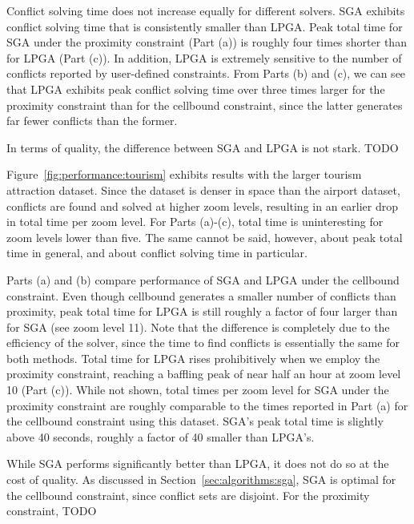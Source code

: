 Conflict solving time does not increase equally for different solvers. SGA exhibits conflict solving time that is consistently smaller than LPGA. Peak total time for SGA under the proximity constraint (Part (a)) is roughly four times shorter than for LPGA (Part (c)). In addition, LPGA is extremely sensitive to the number of conflicts reported by user-defined constraints. From Parts (b) and (c), we can see that LPGA exhibits peak conflict solving time over three times larger for the proximity constraint than for the cellbound constraint, since the latter generates far fewer conflicts than the former. 


In terms of quality, the difference between SGA and LPGA is not stark. TODO


Figure~\ref{fig:performance:tourism} exhibits results with the larger tourism attraction dataset. Since the dataset is denser in space than the airport dataset, conflicts are found and solved at higher zoom levels, resulting in an earlier drop in total time per zoom level. For Parts (a)-(c), total time is uninteresting for zoom levels lower than five. The same cannot be said, however, about peak total time in general, and about conflict solving time in particular.

Parts (a) and (b) compare performance of SGA and LPGA under the cellbound constraint. Even though cellbound generates a smaller number of conflicts than proximity, peak total time for LPGA is still roughly a factor of four larger than for SGA (see zoom level 11). Note that the difference is completely due to the efficiency of the solver, since the time to find conflicts is essentially the same for both methods. Total time for LPGA rises prohibitively when we employ the proximity constraint, reaching a baffling peak of near half an hour at zoom level 10 (Part (c)). While not shown, total times per zoom level for SGA under the proximity constraint are roughly comparable to the times reported in Part (a) for the cellbound constraint using this dataset. SGA's peak total time is slightly above 40 seconds, roughly a factor of 40 smaller than LPGA's.         

While SGA performs significantly better than LPGA, it does not do so at the cost of quality. As discussed in Section~\ref{sec:algorithms:sga}, SGA is optimal for the cellbound constraint, since conflict sets are disjoint. For the proximity constraint, TODO

